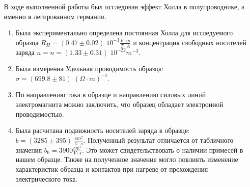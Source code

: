 \documentclass{article}
\begin{document}
В ходе выполненной работы был исследован эффект Холла в полупроводнике, а именно в легированном германии.
\begin{enumerate}
    \item Была экспериментально определена постоянная Холла для исследуемого образца
\( R_H = (0.47 \pm 0.02)\; 10^{-3} \frac{V\cdot m}{T\cdot A} \) и концентрация свободных носителей заряда
\( n = n = (1.33 \pm 0.31)\; 10^{-22}m^{-3} \).
    \item Была измеренна Удельная проводимость образца: \\
\( \sigma = (699.8 \pm 81)\; (\Omega\cdot m)^{-1} \).
    \item По направлению тока в образце и направлению силовых линий электромагнита можно заключить, что
образец обладает электронной проводимостью.
    \item Была расчитана подвижность носителей заряда в образце:
\( b = (3285 \pm 395)\; \frac{cm^2}{V\cdot s} \). Полученный результат отличается от табличного значения
\( b_0 = 3900 \frac{cm^2}{V\cdot s} \). Это может свидетельствовать о наличии примесей в нашем образце. 
Также на полученное значение могло повлиять изменение характеристик образца и контактов при нагреве от
прохождения электрического тока.
\end{enumerate}
\end{document}
